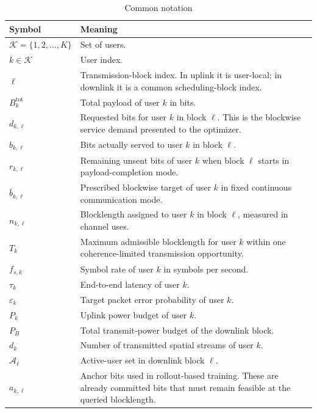 \documentclass[11pt]{article}
\newcommand{\Kset}{\mathcal{K}}
\newcommand{\Aset}{\mathcal{A}}
\begin{document}
\begin{table}[ht]
\centering
\small
\caption{Common notation}
\label{tab:common-notation}
\renewcommand{\arraystretch}{1.15}
\begin{tabularx}{\textwidth}{>{\raggedright\arraybackslash}p{} X}
\toprule
Symbol & Meaning \\
\midrule
$\Kset = \{1,2,\dots,K\}$ & Set of users. \\
$k \in \Kset$ & User index. \\
$\ell$ & Transmission-block index. In uplink it is user-local; in downlink it is a common scheduling-block index. \\
$B_k^{\mathrm{tot}}$ & Total payload of user $k$ in bits. \\
$d_{k,\ell}$ & Requested bits for user $k$ in block $\ell$. This is the blockwise service demand presented to the optimizer. \\
$b_{k,\ell}$ & Bits actually served to user $k$ in block $\ell$. \\
$r_{k,\ell}$ & Remaining unsent bits of user $k$ when block $\ell$ starts in payload-completion mode. \\
$\bar b_{k,\ell}$ & Prescribed blockwise target of user $k$ in fixed continuous communication mode. \\
$n_{k,\ell}$ & Blocklength assigned to user $k$ in block $\ell$, measured in channel uses. \\
$T_k$ & Maximum admissible blocklength for user $k$ within one coherence-limited transmission opportunity. \\
$f_{s,k}$ & Symbol rate of user $k$ in symbols per second. \\
$\tau_k$ & End-to-end latency of user $k$. \\
$\varepsilon_k$ & Target packet error probability of user $k$. \\
$P_k$ & Uplink power budget of user $k$. \\
$P_B$ & Total transmit-power budget of the downlink block. \\
$d_k$ & Number of transmitted spatial streams of user $k$. \\
$\Aset_\ell$ & Active-user set in downlink block $\ell$. \\
$a_{k,\ell}$ & Anchor bits used in rollout-based training. These are already committed bits that must remain feasible at the queried blocklength. \\
\bottomrule
\end{tabularx}
\end{table}
\end{document}
